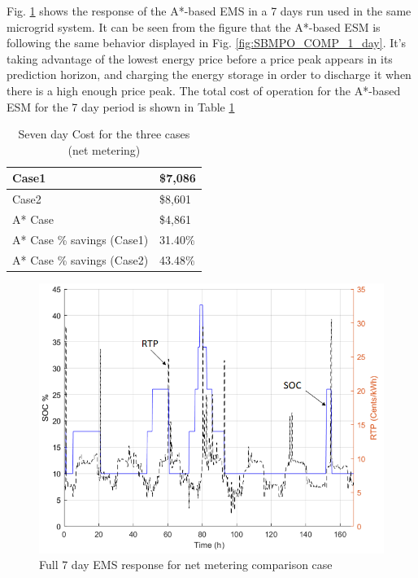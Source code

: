 Fig. \ref{fig:SBMPO_COMP_10_12} shows the response of the A*-based EMS in a  7 days run used in the same microgrid system.  It can be seen from the figure that the A*-based ESM is following the same behavior displayed in Fig. \ref{fig:SBMPO_COMP_1_day}. It's taking advantage of the lowest energy price before a price peak appears in its prediction horizon, and charging the energy storage in order to discharge it when there is a high enough price peak. The total cost of operation for the A*-based ESM for the 7 day period is shown in Table \ref{tab:Cost1}

\begin{table}[htb]
\caption{Seven day Cost for the three cases (net metering)}
\centering
\label{tab:Cost1}
\begin{tabular}{|l|l|}
\hline
Case1 & \$7,086 \\ \hline
Case2 & \$8,601 \\ \hline
A* Case & \$4,861 \\ \hline
A* Case \% savings (Case1) & 31.40\% \\ \hline
A* Case \% savings (Case2) & 43.48\% \\ \hline

\end{tabular}
\end{table}

\begin{figure}[!ht]
    \centering
    \includegraphics[width = \linewidth]{figs/SBMPO_COMP_10_12.png}
    \caption{Full 7 day EMS response for net metering comparison case}
    \label{fig:SBMPO_COMP_10_12}
\end{figure}

